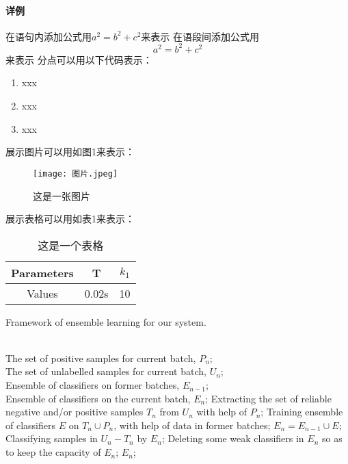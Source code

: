 \documentclass[12pt]{article}
\begin{document}
\paragraph{\songti{}详例}
\clearpage
\songti{}在语句内添加公式用$a^2=b^2+c^2$来表示
\songti{}在语段间添加公式用$$a^2=b^2+c^2$$来表示
\clearpage
\songti{}分点可以用以下代码表示：
\begin{enumerate}
    \songti{}\item xxx
    \songti{}\item xxx
    \songti{}\item xxx
\end{enumerate}
\clearpage
\songti{}展示图片可以用如图1来表示：
\begin{figure}[H]
    \label{fig:图片}
    \centering
    \texttt{[image: 图片.jpeg]}
    \caption{\fangsong 这是一张图片}
\end{figure}
\clearpage
\songti{}展示表格可以用如表1来表示：
\begin{table}[H]
    \centering
    \begin{tabular}{ccc}
        \hline
        Parameters & T & $k_1$ \\ 
        \hline
        Values & 0.02s & 10 \\ 
        \hline
    \end{tabular}
    \caption{\fangsong 这是一个表格}
\end{table}
\clearpage
\begin{algorithm}[htb]
    \caption{ Framework of ensemble learning for our system.}
    \label{alg:Framwork}
    \begin{algorithmic}[1] %
    \REQUIRE ~~\\ %
        The set of positive samples for current batch, $P_n$;\\
        The set of unlabelled samples for current batch, $U_n$;\\
        Ensemble of classifiers on former batches, $E_{n-1}$;
    \ENSURE ~~\\ %
        Ensemble of classifiers on the current batch, $E_n$;
        \STATE Extracting the set of reliable negative and/or positive samples $T_n$ from $U_n$ with help of $P_n$;
        \STATE Training ensemble of classifiers $E$ on $T_n \cup P_n$, with help of data in former batches;
        \STATE $E_n=E_{n-1}\cup E$;
        \STATE Classifying samples in $U_n-T_n$ by $E_n$;
        \STATE Deleting some weak classifiers in $E_n$ so as to keep the capacity of $E_n$;
    \RETURN $E_n$; %
    \end{algorithmic}
\end{algorithm}
\end{document}
